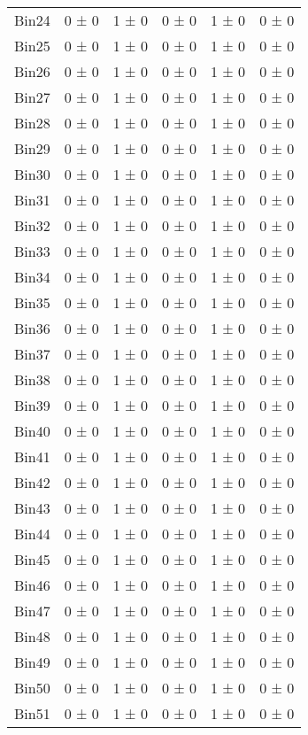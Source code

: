 \begin{tabular}{@{\extracolsep{4pt}}lccccc@{}}
     Bin24 & 0 ± 0 & 1 ± 0 & 0 ± 0 & 1 ± 0 & 0 ± 0 \\ 
     Bin25 & 0 ± 0 & 1 ± 0 & 0 ± 0 & 1 ± 0 & 0 ± 0 \\ 
     Bin26 & 0 ± 0 & 1 ± 0 & 0 ± 0 & 1 ± 0 & 0 ± 0 \\ 
     Bin27 & 0 ± 0 & 1 ± 0 & 0 ± 0 & 1 ± 0 & 0 ± 0 \\ 
     Bin28 & 0 ± 0 & 1 ± 0 & 0 ± 0 & 1 ± 0 & 0 ± 0 \\ 
     Bin29 & 0 ± 0 & 1 ± 0 & 0 ± 0 & 1 ± 0 & 0 ± 0 \\ 
     Bin30 & 0 ± 0 & 1 ± 0 & 0 ± 0 & 1 ± 0 & 0 ± 0 \\ 
     Bin31 & 0 ± 0 & 1 ± 0 & 0 ± 0 & 1 ± 0 & 0 ± 0 \\ 
     Bin32 & 0 ± 0 & 1 ± 0 & 0 ± 0 & 1 ± 0 & 0 ± 0 \\ 
     Bin33 & 0 ± 0 & 1 ± 0 & 0 ± 0 & 1 ± 0 & 0 ± 0 \\ 
     Bin34 & 0 ± 0 & 1 ± 0 & 0 ± 0 & 1 ± 0 & 0 ± 0 \\ 
     Bin35 & 0 ± 0 & 1 ± 0 & 0 ± 0 & 1 ± 0 & 0 ± 0 \\ 
     Bin36 & 0 ± 0 & 1 ± 0 & 0 ± 0 & 1 ± 0 & 0 ± 0 \\ 
     Bin37 & 0 ± 0 & 1 ± 0 & 0 ± 0 & 1 ± 0 & 0 ± 0 \\ 
     Bin38 & 0 ± 0 & 1 ± 0 & 0 ± 0 & 1 ± 0 & 0 ± 0 \\ 
     Bin39 & 0 ± 0 & 1 ± 0 & 0 ± 0 & 1 ± 0 & 0 ± 0 \\ 
     Bin40 & 0 ± 0 & 1 ± 0 & 0 ± 0 & 1 ± 0 & 0 ± 0 \\ 
     Bin41 & 0 ± 0 & 1 ± 0 & 0 ± 0 & 1 ± 0 & 0 ± 0 \\ 
     Bin42 & 0 ± 0 & 1 ± 0 & 0 ± 0 & 1 ± 0 & 0 ± 0 \\ 
     Bin43 & 0 ± 0 & 1 ± 0 & 0 ± 0 & 1 ± 0 & 0 ± 0 \\ 
     Bin44 & 0 ± 0 & 1 ± 0 & 0 ± 0 & 1 ± 0 & 0 ± 0 \\ 
     Bin45 & 0 ± 0 & 1 ± 0 & 0 ± 0 & 1 ± 0 & 0 ± 0 \\ 
     Bin46 & 0 ± 0 & 1 ± 0 & 0 ± 0 & 1 ± 0 & 0 ± 0 \\ 
     Bin47 & 0 ± 0 & 1 ± 0 & 0 ± 0 & 1 ± 0 & 0 ± 0 \\ 
     Bin48 & 0 ± 0 & 1 ± 0 & 0 ± 0 & 1 ± 0 & 0 ± 0 \\ 
     Bin49 & 0 ± 0 & 1 ± 0 & 0 ± 0 & 1 ± 0 & 0 ± 0 \\ 
     Bin50 & 0 ± 0 & 1 ± 0 & 0 ± 0 & 1 ± 0 & 0 ± 0 \\ 
     Bin51 & 0 ± 0 & 1 ± 0 & 0 ± 0 & 1 ± 0 & 0 ± 0 \\ 

\end{tabular}
